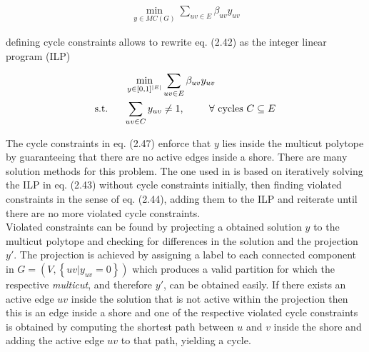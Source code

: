 \begin{align}
	\min_{y \in MC(G)} \sum_{uv \in E} \beta_{uv} y_{uv}
\end{align}

defining cycle constraints allows to rewrite eq. (2.42) as the integer linear program (ILP)

\begin{align}
	\min_{y \in [0, 1]^{|E|}} & \sum_{uv \in E} \beta_{uv} y_{uv} \\
	 \text{s.t. \hspace{4mm}} \sum_{uv \in C} y_{uv} & \neq 1 \text{, \hspace{8mm}} \forall \text{ cycles } C \subseteq E 
\end{align}

The cycle constraints in eq. (2.47) enforce that $y$ lies inside the multicut polytope by guaranteeing that there are no active edges inside a shore. There are many solution methods for this problem. The one used in \cite{10.1007/978-3-642-23094-3_3} is based on iteratively solving the ILP in eq. (2.43) without cycle constraints initially, then finding violated constraints in the sense of eq. (2.44), adding them to the ILP and reiterate until there are no more violated cycle constraints.\\
Violated constraints can be found by projecting a obtained solution $y$ to the multicut polytope and checking for differences in the solution and the projection $y'$.
The projection is achieved by assigning a label to each connected component in $G=(V, \left\{ uv | y_{uv} = 0 \right\})$ which produces a valid partition for which the respective \emph{multicut}, and therefore $y'$, can be obtained easily. If there exists an active edge $uv$ inside the solution that is not active within the projection then this is an edge inside a shore and one of the respective violated cycle constraints is obtained by computing the shortest path between $u$ and $v$ inside the shore and adding the active edge $uv$ to that path, yielding a cycle.
